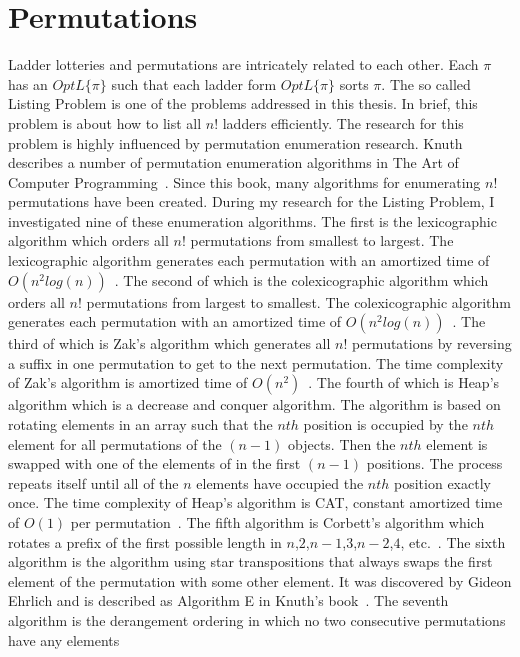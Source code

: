\section{Permutations}
Ladder lotteries and permutations are intricately related to each other. Each $\pi$ has an $OptL\{\pi\}$ such that 
each ladder form $OptL\{\pi\}$ sorts $\pi$. The so called Listing Problem is one of the problems addressed in this thesis.
In brief, this problem is about how to list all $n!$ ladders efficiently. The research for this problem is highly influenced 
by permutation enumeration research. Knuth describes a number of 
permutation enumeration algorithms in The Art of Computer Programming~\cite{A18}. Since this book, many algorithms for 
enumerating $n!$ permutations have been created. During my research for the Listing Problem, I investigated nine of these 
enumeration algorithms\cite{A18}\cite{A19}\cite{A21}\cite{A24}\cite{A25}\cite{A26}\cite{A31}\cite{A34}\cite{A35}. 
The first is the lexicographic algorithm which orders all $n!$ permutations from smallest to largest. The lexicographic 
algorithm generates each permutation with an amortized time of $O(n^{2}log(n))$~\cite{A21}. The second of which is the 
colexicographic algorithm which orders all $n!$ permutations from largest to smallest. The colexicographic 
algorithm generates each permutation with an amortized time of $O(n^{2}log(n))$~\cite{A19}. The third of which is Zak's 
algorithm which generates all $n!$ permutations by reversing a suffix in one permutation to get to the next 
permutation. The time complexity of Zak's algorithm is amortized time of $O(n^{2})$~\cite{A31}.
The fourth of which is Heap's algorithm which is a decrease and conquer algorithm.  
The algorithm is based on rotating elements in an array such that the $nth$ position 
is occupied by the $nth$ element for all permutations of the $(n-1)$ objects. 
Then the $nth$ element is swapped with one of the elements of in the first $(n-1)$ positions.
The process repeats itself until all of the $n$ elements have occupied the $nth$ position exactly once. 
The time complexity of Heap's algorithm is {\sc CAT}, constant amortized time of $O(1)$ per permutation~\cite{A24}.
The fifth algorithm is Corbett's algorithm which rotates a prefix of the first possible length in 
$n$,$2$,$n-1$,$3$,$n-2$,$4$, etc.~\cite{A34}. The sixth algorithm is 
the algorithm using star transpositions that always swaps the first element of the permutation with some other element. 
It was discovered by Gideon Ehrlich and is described as Algorithm E in Knuth's book~\cite{A18}.
The seventh algorithm is the derangement ordering in which no two consecutive permutations have any elements 
